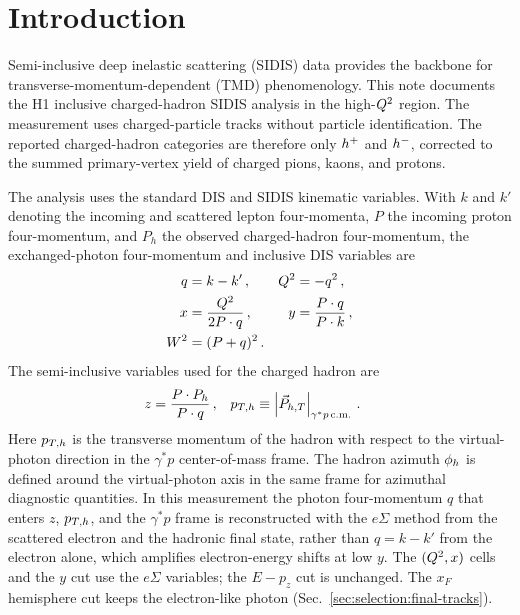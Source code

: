 \section{Introduction}
\label{sec:introduction}

Semi-inclusive deep inelastic scattering (SIDIS) data provides the backbone for transverse-momentum-dependent (TMD) phenomenology. This note documents the H1 inclusive charged-hadron SIDIS analysis in the high-$Q^{2}$ region.  The
measurement uses charged-particle tracks without particle identification.  The
reported charged-hadron categories are therefore only $h^{+}$ and $h^{-}$,
corrected to the summed primary-vertex yield of charged pions, kaons, and
protons.

The analysis uses the standard DIS and SIDIS kinematic variables.  With $k$ and
$k'$ denoting the incoming and scattered lepton four-momenta, $P$ the incoming
proton four-momentum, and $P_h$ the observed charged-hadron four-momentum, the
exchanged-photon four-momentum and inclusive DIS variables are
\begin{align}
  q &= k-k'\, , & Q^{2} &= -q^2\, , \\
  x &= \frac{Q^{2}}{2 P\cdot q}\, , &
  y &= \frac{P\cdot q}{P\cdot k}\, , \\
  W^2 &= (P+q)^2\, .
  \label{eq:intro:dis-variables}
\end{align}
The semi-inclusive variables used for the charged hadron are
\begin{align}
  z &= \frac{P\cdot P_h}{P\cdot q}\, , &
  p_{T,h} &\equiv \left|\vec{P}_{h,T}\right|_{\gamma^{*}p\,\mathrm{c.m.}}\, .
  \label{eq:intro:sidis-variables}
\end{align}
Here $p_{T,h}$ is the transverse momentum of the hadron with respect to the
virtual-photon direction in the $\gamma^{*}p$ center-of-mass frame.  The hadron
azimuth $\phi_{h}$ is defined around the virtual-photon axis in the same frame for
azimuthal diagnostic quantities.  In this measurement the photon four-momentum $q$ that
enters $z$, $p_{T,h}$, and the $\gamma^{*}p$ frame is reconstructed with the
$e\Sigma$ method from the scattered electron and the hadronic final state, rather than
$q=k-k'$ from the electron alone, which amplifies electron-energy shifts at low $y$.
The $(Q^{2},x)$ cells and the $y$ cut use the $e\Sigma$ variables; the $E-p_z$ cut is unchanged.  The $x_F$ hemisphere cut keeps the
electron-like photon (Sec.~\ref{sec:selection:final-tracks}).

